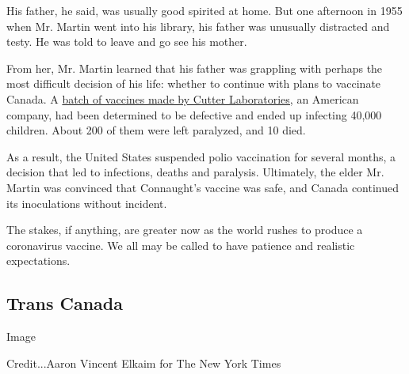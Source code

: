 His father, he said, was usually good spirited at home. But one
afternoon in 1955 when Mr. Martin went into his library, his father was
unusually distracted and testy. He was told to leave and go see his
mother.

From her, Mr. Martin learned that his father was grappling with perhaps
the most difficult decision of his life: whether to continue with plans
to vaccinate Canada. A
\href{https://www.ncbi.nlm.nih.gov/pmc/articles/PMC1383764/}{batch of
vaccines made by Cutter Laboratories,} an American company, had been
determined to be defective and ended up infecting 40,000 children. About
200 of them were left paralyzed, and 10 died.

As a result, the United States suspended polio vaccination for several
months, a decision that led to infections, deaths and paralysis.
Ultimately, the elder Mr. Martin was convinced that Connaught's vaccine
was safe, and Canada continued its inoculations without incident.

The stakes, if anything, are greater now as the world rushes to produce
a coronavirus vaccine. We all may be called to have patience and
realistic expectations.

\hypertarget{trans-canada}{%
\subsection{Trans Canada}\label{trans-canada}}

Image

Credit...Aaron Vincent Elkaim for The New York Times

